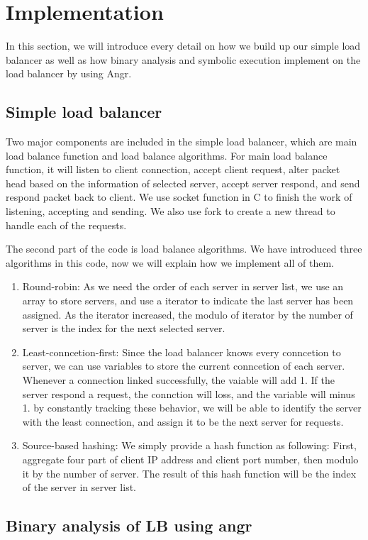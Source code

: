 \section{Implementation}

In this section, we will introduce every detail on how we build up our simple load balancer as well as how binary analysis and symbolic execution implement on the load balancer by using Angr.

\subsection{Simple load balancer}
Two major components are included in the simple load balancer, which are main load balance function and load balance algorithms.
For main load balance function, it will \ca listen to client connection, \cb accept client request, \cc alter packet head based on the information of selected server, \cd accept server respond, and \ce send respond packet back to client.
We use socket function in C to finish the work of listening, accepting and sending.
We also use fork to create a new thread to handle each of the requests.

The second part of the code is load balance algorithms.
We have introduced three algorithms in this code, now we will explain how we implement all of them.
\begin{enumerate}
	\item Round-robin: As we need the order of each server in server list, we use an array to store servers, and use a iterator to indicate the last server has been assigned. As the iterator increased, the modulo of iterator by the number of server is the index for the next selected server.
	\item Least-conncetion-first: Since the load balancer knows every conncetion to server, we can use variables to store the current conncetion of each server. Whenever a connection linked successfully, the vaiable will add 1. If the server respond a request, the connction will loss, and the variable will minus 1. by constantly tracking these behavior, we will be able to identify the server with the least connection, and assign it to be the next server for requests.
	\item Source-based hashing: We simply provide a hash function as following:  First, aggregate four part of client IP address and client port number, then modulo it by the number of server. The result of this hash function will be the index of the server in server list.
\end{enumerate}

\subsection{Binary analysis of LB using angr}

